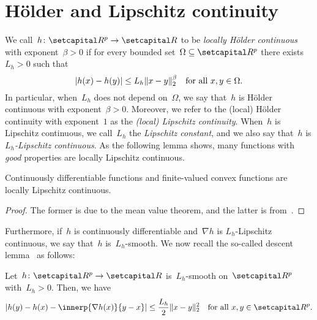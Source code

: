 \documentclass[../main]{subfiles}
\begin{document}
\section{H\"older and Lipschitz continuity}
We call~$h \colon \setR^p \to \setR$ to be \emph{locally H\"older continuous} with exponent~$\beta > 0$ if for every bounded set~$\Omega \subseteq \setR^p$ there exists~$L_h > 0$ such that
\begin{equation}
    \lvert h(x) - h(y)\rvert \le L_h \lVert x - y\rVert_2^\beta \quad \text{for all~$x, y \in \Omega$}
    .\end{equation}
In particular, when~$L_h$ does not depend on~$\Omega$, we say that~$h$ is H\"older continuous with exponent~$\beta > 0$.
Moreover, we refer to the (local) H\"older continuity with exponent~$1$ as the \emph{(local) Lipschitz continuity}.
When~$h$ is Lipschitz continuous, we call~$L_h$ the \emph{Lipschitz constant}, and we also say that~$h$ is \emph{$L_h$-Lipschitz continuous}.
As the following lemma shows, many functions with \emph{good} properties are locally Lipschitz continuous.
\begin{lemma} 
    Continuously differentiable functions and finite-valued convex functions are locally Lipschitz continuous.
\end{lemma}
\begin{proof}
    The former is due to the mean value theorem, and the latter is from~\cite{WayneStateUniversity1972}.
\end{proof}

Furthermore, if~$h$ is continuously differentiable and~$\nabla h$ is $L_h$-Lipschitz continuous, we say that~$h$ is~$L_h$-smooth.
We now recall the so-called descent lemma~\cite[Proposition A.24]{Bertsekas1999} as follows:
\begin{lemma} 
    Let~$h \colon \setR^p \to \setR$ is~$L_h$-smooth on~$\setR^p$ with~$L_h > 0$.
    Then, we have
    \begin{equation}
        \abs{h(y) - h(x) - \innerp{\nabla h(x)}{y - x}} \le \frac{L_h}{2} \norm{x - y}_2^2 \forallcondition{x, y \in \setR^p}
        .\end{equation}
\end{lemma}
\end{document}
